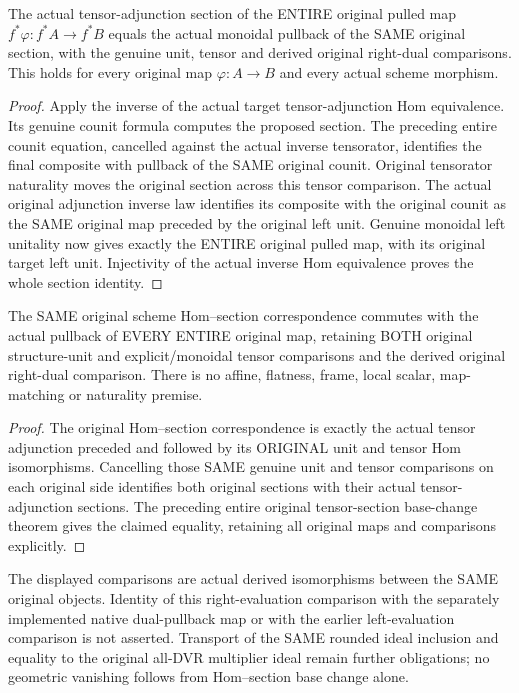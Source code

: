 \begin{theorem}\label{sc0-hom-section-base-change:tensor-section}
\leanok
{}
The actual tensor-adjunction section of the ENTIRE original pulled map $f^*\varphi:f^*A\to f^*B$ equals the actual monoidal pullback of the SAME original section, with the genuine unit, tensor and derived original right-dual comparisons. This holds for every original map $\varphi:A\to B$ and every actual scheme morphism.
\end{theorem}
\begin{proof}
Apply the inverse of the actual target tensor-adjunction Hom equivalence. Its genuine counit formula computes the proposed section. The preceding entire counit equation, cancelled against the actual inverse tensorator, identifies the final composite with pullback of the SAME original counit. Original tensorator naturality moves the original section across this tensor comparison. The actual original adjunction inverse law identifies its composite with the original counit as the SAME original map preceded by the original left unit. Genuine monoidal left unitality now gives exactly the ENTIRE original pulled map, with its original target left unit. Injectivity of the actual inverse Hom equivalence proves the whole section identity.
\end{proof}

\begin{theorem}\label{sc0-hom-section-base-change:original-hom-section}
\leanok
{}
The SAME original scheme Hom--section correspondence commutes with the actual pullback of EVERY ENTIRE original map, retaining BOTH original structure-unit and explicit/monoidal tensor comparisons and the derived original right-dual comparison. There is no affine, flatness, frame, local scalar, map-matching or naturality premise.
\end{theorem}
\begin{proof}
The original Hom--section correspondence is exactly the actual tensor adjunction preceded and followed by its ORIGINAL unit and tensor Hom isomorphisms. Cancelling those SAME genuine unit and tensor comparisons on each original side identifies both original sections with their actual tensor-adjunction sections. The preceding entire original tensor-section base-change theorem gives the claimed equality, retaining all original maps and comparisons explicitly.
\end{proof}

The displayed comparisons are actual derived isomorphisms between the SAME original objects. Identity of this right-evaluation comparison with the separately implemented native dual-pullback map or with the earlier left-evaluation comparison is not asserted. Transport of the SAME rounded ideal inclusion and equality to the original all-DVR multiplier ideal remain further obligations; no geometric vanishing follows from Hom--section base change alone.
